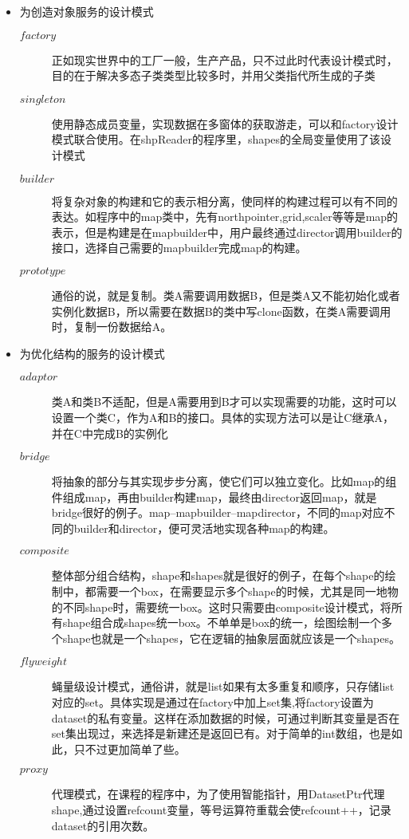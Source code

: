 \documentclass[a4paper,16pt,UTF8]{article}
\begin{document}
    \begin{center}
        \begin{itemize}
            \item 为创造对象服务的设计模式
            \begin{description}
                \item[$factory$]正如现实世界中的工厂一般，生产产品，只不过此时代表设计模式时，目的在于解决多态子类类型比较多时，并用父类指代所生成的子类
                \item[$singleton$]使用静态成员变量，实现数据在多窗体的获取游走，可以和factory设计模式联合使用。在shpReader的程序里，shapes的全局变量使用了该设计模式
                \item[$builder$]将复杂对象的构建和它的表示相分离，使同样的构建过程可以有不同的表达。如程序中的map类中，先有northpointer,grid,scaler等等是map的表示，但是构建是在mapbuilder中，用户最终通过director调用builder的接口，选择自己需要的mapbuilder完成map的构建。
                \item[$prototype$]通俗的说，就是复制。类A需要调用数据B，但是类A又不能初始化或者实例化数据B，所以需要在数据B的类中写clone函数，在类A需要调用时，复制一份数据给A。              
            \end{description}

            \item 为优化结构的服务的设计模式
            \begin{description}
                \item[$adaptor$]类A和类B不适配，但是A需要用到B才可以实现需要的功能，这时可以设置一个类C，作为A和B的接口。具体的实现方法可以是让C继承A，并在C中完成B的实例化
                \item[$bridge$]将抽象的部分与其实现步步分离，使它们可以独立变化。比如map的组件组成map，再由builder构建map，最终由director返回map，就是bridge很好的例子。map--mapbuilder--mapdirector，不同的map对应不同的builder和director，便可灵活地实现各种map的构建。
                \item[$composite$]整体部分组合结构，shape和shapes就是很好的例子，在每个shape的绘制中，都需要一个box，在需要显示多个shape的时候，尤其是同一地物的不同shape时，需要统一box。这时只需要由composite设计模式，将所有shape组合成shapes统一box。不单单是box的统一，绘图绘制一个多个shape也就是一个shapes，它在逻辑的抽象层面就应该是一个shapes。
                \item[$flyweight$]蝇量级设计模式，通俗讲，就是list如果有太多重复和顺序，只存储list对应的set。具体实现是通过在factory中加上set集,将factory设置为dataset的私有变量。这样在添加数据的时候，可通过判断其变量是否在set集出现过，来选择是新建还是返回已有。对于简单的int数组，也是如此，只不过更加简单了些。
                \item[$proxy$]代理模式，在课程的程序中，为了使用智能指针，用DatasetPtr代理shape,通过设置refcount变量，等号运算符重载会使refcount++，记录dataset的引用次数。
            \end{description}


\end{itemize}
\end{center}
\end{document}
